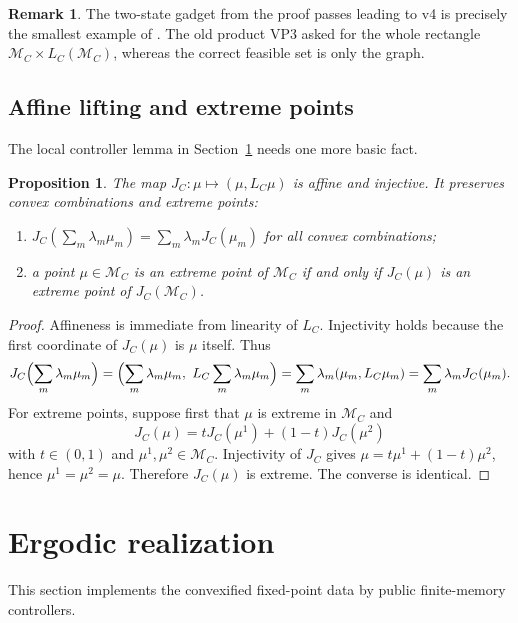 \documentclass[12pt]{article}
\newtheorem{proposition}[theorem]{Proposition}
\theoremstyle{definition}
\newtheorem{remark}[theorem]{Remark}
\newcommand{\1}{\mathbf{1}}
\newcommand{\cM}{\mathcal{M}}
\begin{document}
\begin{remark}
The two-state gadget from the proof passes leading to v4 is precisely the smallest example
of .  The old product VP3 asked for the whole rectangle
\(\cM_C\times L_C(\cM_C)\), whereas the correct feasible set is only the graph.
\end{remark}

\subsection{Affine lifting and extreme points}

The local controller lemma in Section~\ref{sec:realization} needs one more basic fact.

\begin{proposition}
\label{prop:JC-extreme}
The map \(J_C:\mu\mapsto (\mu,L_C\mu)\) is affine and injective.  It preserves convex
combinations and extreme points:
\begin{enumerate}[label=\textnormal{(\roman*)},leftmargin=2.6em]
\item \(J_C(\sum_m \lambda_m\mu_m)=\sum_m \lambda_m J_C(\mu_m)\) for all convex
combinations;
\item a point \(\mu\in \cM_C\) is an extreme point of \(\cM_C\) if and only if \(J_C(\mu)\)
is an extreme point of \(J_C(\cM_C)\).
\end{enumerate}
\end{proposition}

\begin{proof}
Affineness is immediate from linearity of \(L_C\).  Injectivity holds because the first
coordinate of \(J_C(\mu)\) is \(\mu\) itself.  Thus
\[
J_C\Bigl(\sum_m \lambda_m\mu_m\Bigr)
=
\Bigl(\sum_m \lambda_m\mu_m,\ L_C\sum_m \lambda_m\mu_m\Bigr)
=
\sum_m \lambda_m(\mu_m,L_C\mu_m)
=
\sum_m \lambda_m J_C(\mu_m).
\]
For extreme points, suppose first that \(\mu\) is extreme in \(\cM_C\) and
\[
J_C(\mu)=tJ_C(\mu^1)+(1-t)J_C(\mu^2)
\]
with \(t\in(0,1)\) and \(\mu^1,\mu^2\in \cM_C\).  Injectivity of \(J_C\) gives
\(\mu=t\mu^1+(1-t)\mu^2\), hence \(\mu^1=\mu^2=\mu\).  Therefore \(J_C(\mu)\) is
extreme.  The converse is identical.
\end{proof}

\section{Ergodic realization}
\label{sec:realization}

This section implements the convexified fixed-point data by public finite-memory
controllers.
\end{document}
